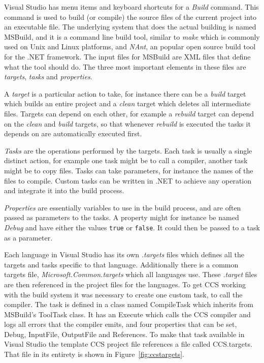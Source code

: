 	Visual Studio has menu items and keyboard shortcuts for a \textit{Build} 
	command. This command is used to build (or compile) the source files of the 
	current project into an executable file. The underlying system that does the 
	actual building is named MSBuild, and it is a command line build tool, 
	similar to \textit{make} which is commonly used on Unix and Linux platforms, 
	and \textit{NAnt}, an popular open source build tool for the .NET framework. 
	The input files for MSBuild are XML files that define what the tool should 
	do. The three most important elements in these files are \textit{targets}, 
	\textit{tasks} and \textit{properties}. 
	
	A \textit{target} is a particular action to take, for instance there can be 
	a \textit{build} target which builds an entire project and a \textit{clean} 
	target which deletes all intermediate files. Targets can depend on each 
	other, for example a \textit{rebuild} target can depend on the 
	\textit{clean} and \textit{build} targets, so that whenever \textit{rebuild} 
	is executed the tasks it depends on are automatically executed first. 
		
	\textit{Tasks} are the operations performed by the targets. Each task is 
	usually a single distinct action, for example one task might be to call a 
	compiler, another task might be to copy files. Tasks can take parameters, 
	for instance the names of the files to compile. Custom tasks can be written 
	in .NET to achieve any operation and integrate it into the build process.
	
	\textit{Properties} are essentially variables to use in the build process, 
	and are often passed as parameters to the tasks. A property might for 
	instance be named \textit{Debug} and have either the values \texttt{true} or 
	\texttt{false}. It could then be passed to a task as a parameter.
	
	Each language in Visual Studio has its own \textit{.targets} files which 
	defines all the targets and tasks specific to that language. Additionally 
	there is a common targets file, \textit{Microsoft.Common.targets} which all 
	languages use. These \textit{.target} files are then referenced in the 
	project files for the languages. To get CCS working with the build system it 
	was necessary to create one custom task, to call the compiler. The task is 
	defined in a class named \textsf{CompileTask} which inherits from MSBuild's 
	\textsf{ToolTask} class. It has an \textsf{Execute} which calls the CCS 
	compiler and logs all errors that the compiler emits, and four properties 
	that can be set, \textsf{Debug}, \textsf{InputFile}, \textsf{OutputFile} and 
	\textsf{References}. To make that task available in Visual Studio the 
	template CCS project file references a file called \textsf{CCS.targets}. 
	That file in its entirety is shown in Figure~\ref{fig:ccstargets}.
	
